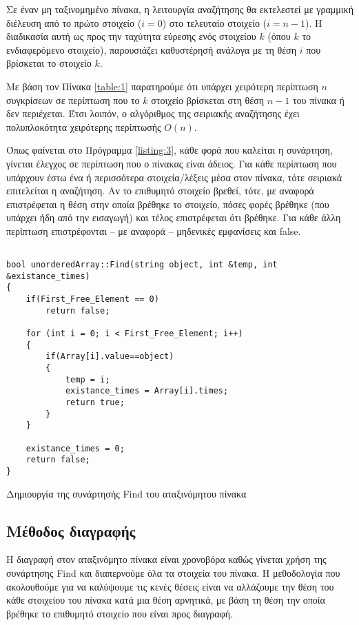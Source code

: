 Σε έναν μη ταξινομημένο πίνακα, η λειτουργία αναζήτησης θα εκτελεστεί με γραμμική διέλευση από το πρώτο στοιχείο ($i=0$) στο τελευταίο στοιχείο ($i=n-1$). Η διαδικασία αυτή ως προς την ταχύτητα εύρεσης ενός στοιχείου $k$ (όπου $k$ το ενδιαφερόμενο στοιχείο), παρουσιάζει καθυστέρησή ανάλογα με τη θέση $i$ που βρίσκεται το στοιχείο $k$.

Με βάση τον Πίνακα \ref{table:1} παρατηρούμε ότι υπάρχει χειρότερη περίπτωση $n$ συγκρίσεων σε περίπτωση που το $k$ στοιχείο βρίσκεται στη θέση $n-1$ του πίνακα ή δεν περιέχεται. Έτσι λοιπόν, ο αλγόριθμος της σειριακής αναζήτησης έχει πολυπλοκότητα χειρότερης περίπτωσής $O(n)$.

Όπως φαίνεται στο Πρόγραμμα \ref{listing:3}, κάθε φορά που καλείται η συνάρτηση, γίνεται έλεγχος σε περίπτωση που ο πίνακας είναι άδειος. Για κάθε περίπτωση που υπάρχουν έστω ένα ή περισσότερα στοιχεία/λέξεις μέσα στον πίνακα, τότε σειριακά επιτελείται η αναζήτηση. Αν το επιθυμητό στοιχείο βρεθεί, τότε, με αναφορά επιστρέφεται η θέση στην οποία βρέθηκε το στοιχείο, πόσες φορές βρέθηκε (που υπάρχει ήδη από την εισαγωγή) και τέλος επιστρέφεται ότι βρέθηκε. Για κάθε άλλη περίπτωση επιστρέφονται -- με αναφορά -- μηδενικές εμφανίσεις και \en false\gr.

\en
\begin{listing}[ht]
\begin{verbatim}

bool unorderedArray::Find(string object, int &temp, int &existance_times)
{
    if(First_Free_Element == 0)
        return false;
        
    for (int i = 0; i < First_Free_Element; i++)
    {
        if(Array[i].value==object)
        {
            temp = i;
            existance_times = Array[i].times;
            return true;
        }
    }

    existance_times = 0;
    return false;
}

\end{verbatim}
\caption{Δημιουργία της συνάρτησής Find του αταξινόμητου πίνακα}
\label{listing:3}
\end{listing}

\subsection{Μέθοδος διαγραφής}

Η διαγραφή στον αταξινόμητο πίνακα είναι χρονοβόρα καθώς γίνεται χρήση της συνάρτησης \en Find \gr και διαπερνούμε όλα τα στοιχεία του πίνακα. Η μεθοδολογία που ακολουθούμε για να καλύψουμε τις κενές θέσεις είναι να αλλάζουμε την θέση του κάθε στοιχείου του πίνακα κατά μια θέση αρνητικά, με βάση τη θέση την οποία βρέθηκε το επιθυμητό στοιχείο που είναι προς διαγραφή.

